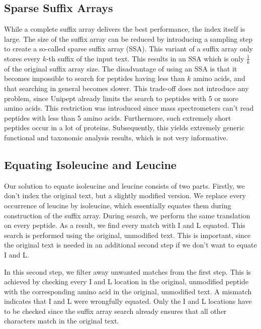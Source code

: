 \documentclass[11pt]{article}
\begin{document}
\begin{multicols}{2}
        \subsection{Sparse Suffix Arrays}
        While a complete suffix array delivers the best performance, the index itself is large.
        The size of the suffix array can be reduced by introducing a sampling step to create a so-called sparse suffix array (SSA).
        This variant of a suffix array only stores every $k$-th suffix of the input text.
        This results in an SSA which is only $\frac{1}{k}$ of the original suffix array size.
        The disadvantage of using an SSA is that it becomes impossible to search for peptides having less than $k$ amino acids, and that searching in general becomes slower.
        This trade-off does not introduce any problem, since Unipept already limits the search to peptides with 5 or more amino acids.
        This restriction was introduced since mass spectrometers can't read peptides with less than 5 amino acids.
        Furthermore, such extremely short peptides occur in a lot of proteins.
        Subsequently, this yields extremely generic functional and taxonomic analysis results, which is not very informative.

        \subsection{Equating Isoleucine and Leucine}
        Our solution to equate isoleucine and leucine consists of two parts.
        Firstly, we don't index the original text, but a slightly modified version.
        We replace every occurrence of leucine by isoleucine, which essentially equates them during construction of the suffix array.
        During search, we perform the same translation on every peptide.
        As a result, we find every match with I and L equated.
        This search is performed using the original, unmodified text.
        This is important, since the original text is needed in an additional second step if we don't want to equate I and L\@.

        In this second step, we filter away unwanted matches from the first step.
        This is achieved by checking every I and L location in the original, unmodified peptide with the corresponding amino acid in the original, unmodified text.
        A mismatch indicates that I and L were wrongfully equated.
        Only the I and L locations have to be checked since the suffix array search already ensures that all other characters match in the original text.


\end{multicols}
\end{document}
